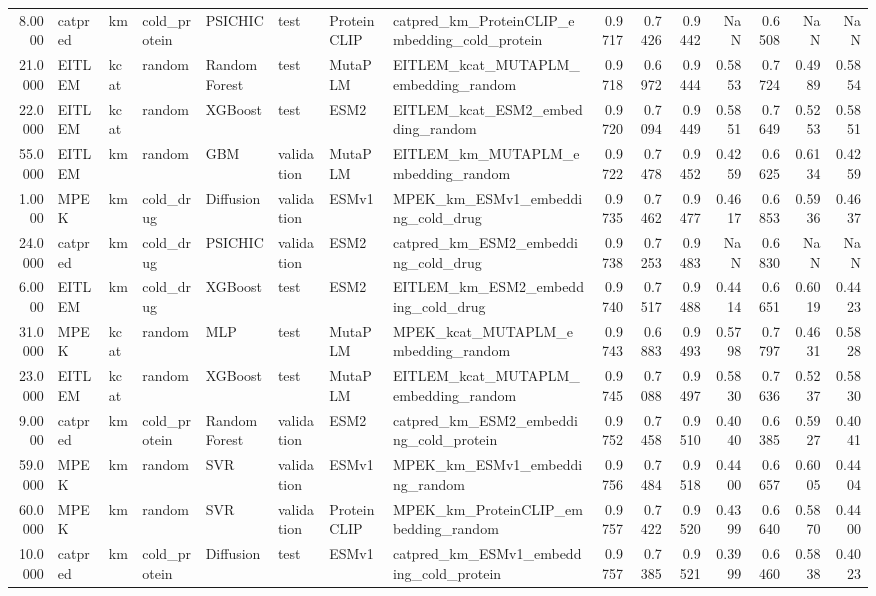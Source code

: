 \begin{tabular}{rlllllllrrrrrrr}
8.0000 & catpred & km & cold_protein & PSICHIC & test & ProteinCLIP & catpred_km_ProteinCLIP_embedding_cold_protein & 0.9717 & 0.7426 & 0.9442 & NaN & 0.6508 & NaN & NaN \\
21.0000 & EITLEM & kcat & random & Random Forest & test & MutaPLM & EITLEM_kcat_MUTAPLM_embedding_random & 0.9718 & 0.6972 & 0.9444 & 0.5853 & 0.7724 & 0.4989 & 0.5854 \\
22.0000 & EITLEM & kcat & random & XGBoost & test & ESM2 & EITLEM_kcat_ESM2_embedding_random & 0.9720 & 0.7094 & 0.9449 & 0.5851 & 0.7649 & 0.5253 & 0.5851 \\
55.0000 & EITLEM & km & random & GBM & validation & MutaPLM & EITLEM_km_MUTAPLM_embedding_random & 0.9722 & 0.7478 & 0.9452 & 0.4259 & 0.6625 & 0.6134 & 0.4259 \\
1.0000 & MPEK & km & cold_drug & Diffusion & validation & ESMv1 & MPEK_km_ESMv1_embedding_cold_drug & 0.9735 & 0.7462 & 0.9477 & 0.4617 & 0.6853 & 0.5936 & 0.4637 \\
24.0000 & catpred & km & cold_drug & PSICHIC & validation & ESM2 & catpred_km_ESM2_embedding_cold_drug & 0.9738 & 0.7253 & 0.9483 & NaN & 0.6830 & NaN & NaN \\
6.0000 & EITLEM & km & cold_drug & XGBoost & test & ESM2 & EITLEM_km_ESM2_embedding_cold_drug & 0.9740 & 0.7517 & 0.9488 & 0.4414 & 0.6651 & 0.6019 & 0.4423 \\
31.0000 & MPEK & kcat & random & MLP & test & MutaPLM & MPEK_kcat_MUTAPLM_embedding_random & 0.9743 & 0.6883 & 0.9493 & 0.5798 & 0.7797 & 0.4631 & 0.5828 \\
23.0000 & EITLEM & kcat & random & XGBoost & test & MutaPLM & EITLEM_kcat_MUTAPLM_embedding_random & 0.9745 & 0.7088 & 0.9497 & 0.5830 & 0.7636 & 0.5237 & 0.5830 \\
9.0000 & catpred & km & cold_protein & Random Forest & validation & ESM2 & catpred_km_ESM2_embedding_cold_protein & 0.9752 & 0.7458 & 0.9510 & 0.4040 & 0.6385 & 0.5927 & 0.4041 \\
59.0000 & MPEK & km & random & SVR & validation & ESMv1 & MPEK_km_ESMv1_embedding_random & 0.9756 & 0.7484 & 0.9518 & 0.4400 & 0.6657 & 0.6005 & 0.4404 \\
60.0000 & MPEK & km & random & SVR & validation & ProteinCLIP & MPEK_km_ProteinCLIP_embedding_random & 0.9757 & 0.7422 & 0.9520 & 0.4399 & 0.6640 & 0.5870 & 0.4400 \\
10.0000 & catpred & km & cold_protein & Diffusion & test & ESMv1 & catpred_km_ESMv1_embedding_cold_protein & 0.9757 & 0.7385 & 0.9521 & 0.3999 & 0.6460 & 0.5838 & 0.4023 \\

\end{tabular}
